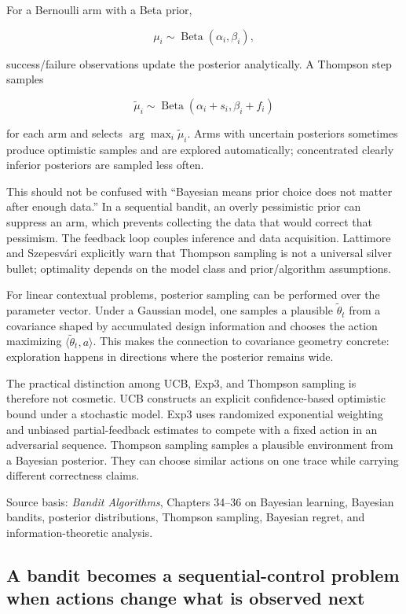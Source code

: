 For a Bernoulli arm with a Beta prior,

\[
\mu_i\sim\operatorname{Beta}(\alpha_i,\beta_i),
\]

success/failure observations update the posterior analytically. A Thompson step samples

\[
\tilde\mu_i\sim
\operatorname{Beta}(\alpha_i+s_i,\beta_i+f_i)
\]

for each arm and selects \(\arg\max_i\tilde\mu_i\). Arms with uncertain posteriors sometimes produce optimistic samples and are explored automatically; concentrated clearly inferior posteriors are sampled less often.

This should not be confused with ``Bayesian means prior choice does not matter after enough data.'' In a sequential bandit, an overly pessimistic prior can suppress an arm, which prevents collecting the data that would correct that pessimism. The feedback loop couples inference and data acquisition. Lattimore and Szepesvári explicitly warn that Thompson sampling is not a universal silver bullet; optimality depends on the model class and prior/algorithm assumptions.

For linear contextual problems, posterior sampling can be performed over the parameter vector. Under a Gaussian model, one samples a plausible \(\tilde\theta_t\) from a covariance shaped by accumulated design information and chooses the action maximizing \(\langle \tilde\theta_t,a\rangle\). This makes the connection to covariance geometry concrete: exploration happens in directions where the posterior remains wide.

The practical distinction among UCB, Exp3, and Thompson sampling is therefore not cosmetic. UCB constructs an explicit confidence-based optimistic bound under a stochastic model. Exp3 uses randomized exponential weighting and unbiased partial-feedback estimates to compete with a fixed action in an adversarial sequence. Thompson sampling samples a plausible environment from a Bayesian posterior. They can choose similar actions on one trace while carrying different correctness claims.

Source basis: \emph{Bandit Algorithms}, Chapters 34--36 on Bayesian learning, Bayesian bandits, posterior distributions, Thompson sampling, Bayesian regret, and information-theoretic analysis.

\subsection{A bandit becomes a sequential-control problem when actions change what is observed next}\label{02-foundations-ii-ch029-a-bandit-becomes-a-sequential-control-problem-when-actions-change-what-is-observed-next}

